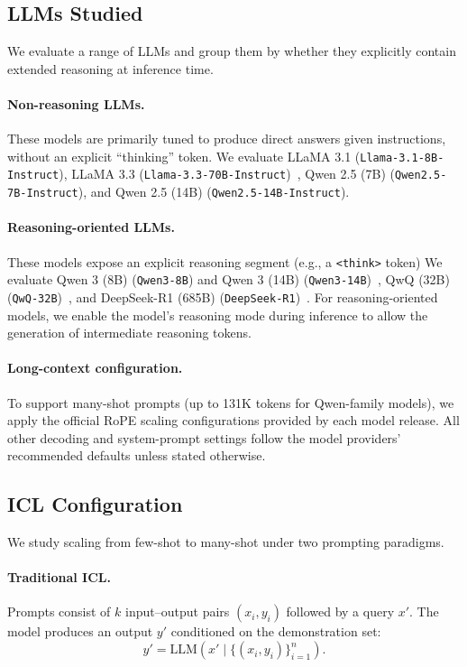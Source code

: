 \documentclass{llmxive}
\begin{document}
\subsection{LLMs Studied}
\label{sec:models}
We evaluate a range of LLMs and group them by whether they explicitly contain extended reasoning at inference time.

\paragraph{Non-reasoning LLMs.}
These models are primarily tuned to produce direct answers given instructions, without an explicit ``thinking'' token.
We evaluate LLaMA 3.1 (\texttt{\small Llama-3.1-8B-Instruct}), LLaMA 3.3 (\texttt{\small Llama-3.3-70B-Instruct})~\cite{llama3}, Qwen 2.5 (7B) (\texttt{\small Qwen2.5-7B-Instruct}), and Qwen 2.5 (14B) (\texttt{\small Qwen2.5-14B-Instruct}).

\paragraph{Reasoning-oriented LLMs.}
These models expose an explicit reasoning segment (e.g., a \texttt{<think>} token)
We evaluate Qwen 3 (8B) (\texttt{\small Qwen3-8B}) and Qwen 3 (14B) (\texttt{\small Qwen3-14B})~\cite{yang2025qwen3technicalreport}, QwQ (32B) (\texttt{\small QwQ-32B})~\cite{qwen2025qwen25technicalreport}, and DeepSeek-R1 (685B) (\texttt{\small DeepSeek-R1})~\cite{deepseekai2025deepseekr1incentivizingreasoningcapability}.
For reasoning-oriented models, we enable the model's reasoning mode during inference to allow the generation of intermediate reasoning tokens.

\paragraph{Long-context configuration.}
To support many-shot prompts (up to 131K tokens for Qwen-family models), we apply the official RoPE scaling configurations provided by each model release.
All other decoding and system-prompt settings follow the model providers' recommended defaults unless stated otherwise.

\subsection{ICL Configuration}
\label{sec:icl_config}
We study scaling from few-shot to many-shot under two prompting paradigms.

\paragraph{Traditional ICL.}
Prompts consist of $k$ input--output pairs $(x_i, y_i)$ followed by a query $x'$.
The model produces an output $y'$ conditioned on the demonstration set:
\begin{equation}
y' = \mathrm{LLM}\!\left(x' \mid \{(x_i, y_i)\}_{i=1}^n\right).
\end{equation}
\end{document}

